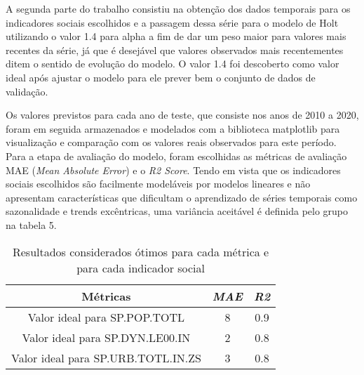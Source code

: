 A segunda parte do trabalho consistiu na obtenção dos dados 
temporais para os indicadores sociais escolhidos e a passagem 
dessa série para o modelo de Holt utilizando o valor 1.4 para 
alpha a fim de dar um peso maior para valores mais recentes 
da série, já que é desejável que valores observados mais 
recentementes ditem o sentido de evolução do modelo. 
O valor 1.4 foi descoberto como valor ideal após ajustar o 
modelo para ele prever bem o conjunto de dados de validação.

Os valores previstos para cada ano de teste, que consiste nos 
anos de 2010 a 2020, foram em seguida armazenados e modelados 
com a biblioteca matplotlib para visualização e comparação 
com os valores reais observados para este período. Para a 
etapa de avaliação do modelo, foram escolhidas as métricas 
de avaliação MAE (\emph{Mean Absolute Error}) e o \emph{R2 Score}. 
Tendo em vista que os indicadores sociais escolhidos 
são facilmente modeláveis por modelos lineares e não 
apresentam características que dificultam o aprendizado 
de séries temporais como sazonalidade e trends excêntricas, 
uma variância aceitável é definida pelo grupo na tabela 5.

\begin{table}[h!]
    \centering
    \begin{tabular}{|c|c|c|}
        \hline
        Métricas & \emph{MAE} & \emph{R2} \\
        \hline
        Valor ideal para SP.POP.TOTL & 8 & 0.9 \\
        \hline 
        Valor ideal para SP.DYN.LE00.IN & 2 & 0.8 \\
        \hline
        Valor ideal para SP.URB.TOTL.IN.ZS & 3 & 0.8 \\
        \hline
    \end{tabular}
    \caption{Resultados considerados ótimos para cada métrica e para cada indicador social}
\end{table}